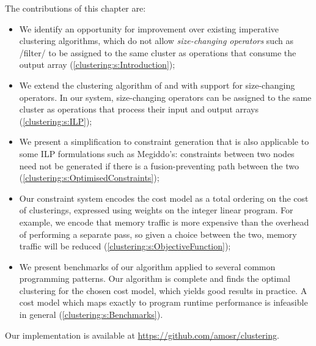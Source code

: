 The contributions of this chapter are:
\begin{itemize}
\item
We identify an opportunity for improvement over existing imperative clustering algorithms, which do not allow \emph{size-changing operators} such as \Hs/filter/ to be assigned to the same cluster as operations that consume the output array (\cref{clustering:s:Introduction});

\item   
We extend the clustering algorithm of \citet{megiddo1998optimal} and \citet{darte2002contraction} with support for size-changing operators.
In our system, size-changing operators can be assigned to the same cluster as operations that process their input and output arrays (\cref{clustering:s:ILP});

\item
We present a simplification to constraint generation that is also applicable to some ILP formulations such as Megiddo's:
constraints between two nodes need not be generated if there is a fusion-preventing path between the two (\cref{clustering:s:OptimisedConstraints});

\item
Our constraint system encodes the cost model as a total ordering on the cost of clusterings, expressed using weights on the integer linear program.
For example, we encode that memory traffic is more expensive than the overhead of performing a separate pass, so given a choice between the two, memory traffic will be reduced (\cref{clustering:s:ObjectiveFunction});

\item
We present benchmarks of our algorithm applied to several common programming patterns.
Our algorithm is complete and finds the optimal clustering for the chosen cost model, which yields good results in practice.
A cost model which maps exactly to program runtime performance is infeasible in general (\cref{clustering:s:Benchmarks}).
\end{itemize}

Our implementation is available at \url{https://github.com/amosr/clustering}.



